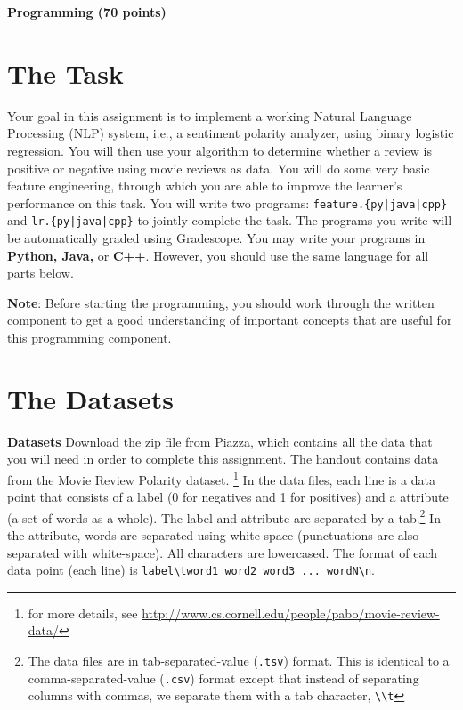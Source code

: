 \documentclass[11pt,addpoints,answers]{exam}
\begin{document}
\begin{questions}
\begin{your_solution}[height=6cm]

\end{your_solution}

\newpage
\end{questions}

{\LARGE \bf Programming (70 points)}

\section{The Task}\label{task}

Your goal in this assignment is to implement a working Natural Language Processing (NLP) system, i.e., a sentiment polarity analyzer, using binary logistic regression. You will then use your algorithm to determine whether a review is positive or negative using movie reviews as data. You will do some very basic feature engineering, through which you are able to improve the learner's performance on this task. You will write two programs: \texttt{feature.\{py|java|cpp\}} and \texttt{lr.\{py|java|cpp\}} to jointly complete the task. The programs you write will be automatically graded using Gradescope. You may write your programs in {\bf Python, Java,} or {\bf C++}. However, you should use the same language for all parts below.

\textbf{Note}: Before starting the programming, you should work through the written component to get a good understanding of important concepts that are useful for this programming component. 

\section{The Datasets}\label{dataset}


  {\bf Datasets } 
 Download the zip file from Piazza, which contains all the data that you will need in order to complete this assignment.
  The handout contains data from the Movie Review Polarity dataset. \footnote{for more details, see \url{http://www.cs.cornell.edu/people/pabo/movie-review-data/}} In the data files, each line is a data point that consists of a label (0 for negatives and 1 for positives) and a attribute (a set of words as a whole). The label and attribute are separated by a tab.\footnote{The data files are in tab-separated-value (\lstinline{.tsv}) format. This is identical to a comma-separated-value (\lstinline{.csv}) format except that instead of separating columns with commas, we separate them with a tab character, \lstinline{\\t}} In the attribute, words are separated using white-space (punctuations are also separated with white-space). All characters are lowercased. The format of each data point (each line) is \lstinline{label\tword1 word2 word3 ... wordN\n}.
\end{document}
